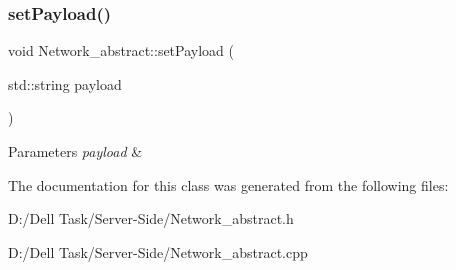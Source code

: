 \subsubsection{\texorpdfstring{set\+Payload()}{setPayload()}}
{\footnotesize\ttfamily void Network\+\_\+abstract\+::set\+Payload (\begin{DoxyParamCaption}\item[{std\+::string}]{payload }\end{DoxyParamCaption})}






\begin{DoxyParams}{Parameters}
{\em payload} & \\
\hline
\end{DoxyParams}


The documentation for this class was generated from the following files\+:\begin{DoxyCompactItemize}
\item 
D\+:/\+Dell Task/\+Server-\/\+Side/Network\+\_\+abstract.\+h\item 
D\+:/\+Dell Task/\+Server-\/\+Side/Network\+\_\+abstract.\+cpp\end{DoxyCompactItemize}
